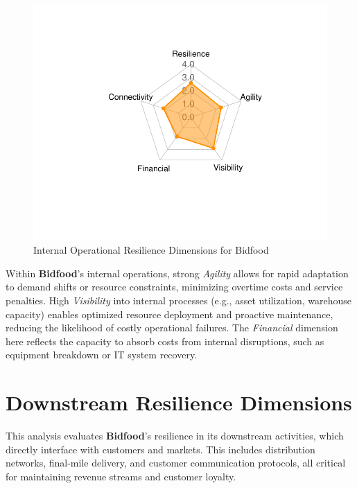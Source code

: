 \documentclass[
  oneside,
  open=any,
  fontsize=11pt]{scrbook}
\begin{document}
\begin{figure}[H]

{\centering \includegraphics[width=0.8\linewidth,height=\textheight,keepaspectratio]{example_3_files/figure-pdf/internal-radar-chart-1.pdf}

}

\caption{Internal Operational Resilience Dimensions for Bidfood}

\end{figure}%

Within \textbf{Bidfood}'s internal operations, strong \emph{Agility}
allows for rapid adaptation to demand shifts or resource constraints,
minimizing overtime costs and service penalties. High \emph{Visibility}
into internal processes (e.g., asset utilization, warehouse capacity)
enables optimized resource deployment and proactive maintenance,
reducing the likelihood of costly operational failures. The
\emph{Financial} dimension here reflects the capacity to absorb costs
from internal disruptions, such as equipment breakdown or IT system
recovery.

\section{Downstream Resilience
Dimensions}\label{downstream-resilience-dimensions}

This analysis evaluates \textbf{Bidfood}'s resilience in its downstream
activities, which directly interface with customers and markets. This
includes distribution networks, final-mile delivery, and customer
communication protocols, all critical for maintaining revenue streams
and customer loyalty.
\end{document}
